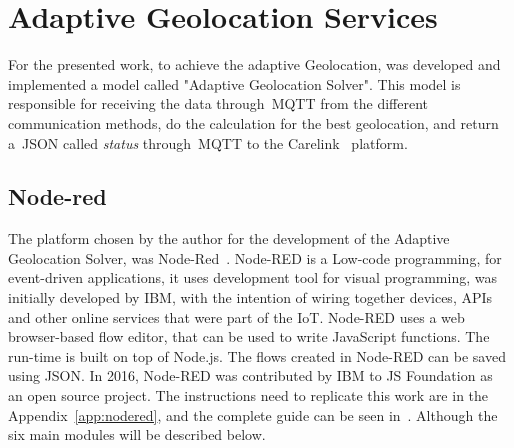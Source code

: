 \newpage

\section{Adaptive Geolocation Services} %
\label{sec:Adaptive Geolocation}
For the presented work, to achieve the adaptive Geolocation, was developed and implemented a model called "Adaptive Geolocation Solver". This model is responsible for receiving the data through~\gls{MQTT} from the different communication methods, do the calculation for the best geolocation, and return a~\gls{JSON} called \emph{status} through~\gls{MQTT} to the Carelink~\cite{carelink} platform.
\subsection{Node-red} %
\label{sec:nodered_sota}
The platform chosen by the author for the development of the Adaptive Geolocation Solver, was Node-Red~\cite{Node}.
Node-RED is a Low-code programming, for event-driven applications, it uses development tool for visual programming, was initially developed by IBM, with the intention of wiring together devices, APIs and other online services that were part of the IoT.
Node-RED uses a web browser-based flow editor, that can be used to write JavaScript functions. The run-time is built on top of Node.js. The flows created in Node-RED can be saved using JSON. In 2016, Node-RED was contributed by IBM  to JS Foundation  as an open source project.
The instructions need to replicate this work are in the Appendix~\ref{app:nodered}, and the complete guide can be seen in~\cite{githubnodered}. Although the six main modules will be described below.

